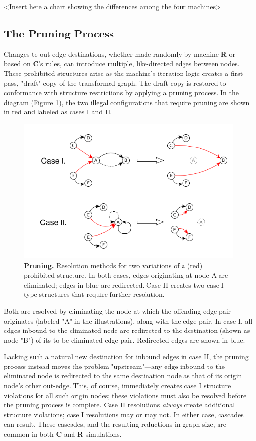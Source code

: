 \documentclass{tufte-handout}
\begin{document}
<Insert here a chart showing the differences among the four machines>

\subsection{The Pruning Process}

Changes to out-edge destinations, whether made randomly by machine \textbf{R} or based on \textbf{C}'s
rules, can introduce multiple, like-directed edges between nodes. These prohibited structures
arise as the machine's iteration logic creates a first-pass, "draft" copy of the transformed graph.
The draft copy is restored to conformance with structure restrictions by applying a
pruning process. In the diagram (Figure \ref{fig:Pruning}),
the two illegal configurations that require pruning are shown in red and
labeled as cases I and II.

\begin{figure}
\includegraphics{pruning.png}
\caption{\textbf{Pruning.} Resolution methods for two variations of a (red) prohibited structure.
In both cases, edges originating at node A are eliminated; edges in blue are redirected.
Case II creates two case I-type structures that require further resolution.}
\label{fig:Pruning}
\end{figure}

Both are resolved by eliminating the node at which the offending edge pair
originates (labeled "A" in the illustrations), along with the edge pair.
In case I, all edges inbound to the eliminated node are redirected to 
the destination (shown as node "B") of its to-be-eliminated edge pair.
Redirected edges are shown in blue.

Lacking such a natural new destination for inbound edges in case II, the
pruning process instead moves the problem "upstream"---any edge inbound to
the eliminated node is redirected to the same destination node as that of
its origin node's other out-edge. This, of course, immediately creates
case I structure violations for all such origin nodes; these violations must also be
resolved before the pruning process is complete.
Case II resolutions \textit{always} create additional structure violations;
case I resolutions may or may not. In either case, cascades can result. These
cascades, and the resulting reductions in graph size, are common in both
\textbf{C} and \textbf{R} simulations.
\end{document}
